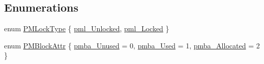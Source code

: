 \subsection*{Enumerations}
\begin{DoxyCompactItemize}
\item 
enum \hyperlink{ID__PM_8H_a470960f2645467be319a542ef1f65851}{PMLockType} \{ \hyperlink{ID__PM_8H_a470960f2645467be319a542ef1f65851ad7573300e04abc96d2c781318ab78f1a}{pml\_\-Unlocked}, 
\hyperlink{ID__PM_8H_a470960f2645467be319a542ef1f65851a7efa3ea64a5cae5233dd638ca11b35d6}{pml\_\-Locked}
 \}
\item 
enum \hyperlink{ID__PM_8H_a061921eacd832e8d25698aed67818b5b}{PMBlockAttr} \{ \hyperlink{ID__PM_8H_a061921eacd832e8d25698aed67818b5ba439b0558ad54d83b7cca487607714a76}{pmba\_\-Unused} =  0, 
\hyperlink{ID__PM_8H_a061921eacd832e8d25698aed67818b5ba99ecca1f78b2189c74695a5171796a07}{pmba\_\-Used} =  1, 
\hyperlink{ID__PM_8H_a061921eacd832e8d25698aed67818b5ba807fb1ba068480551947952c5dd1c14c}{pmba\_\-Allocated} =  2
 \}
\end{DoxyCompactItemize}
